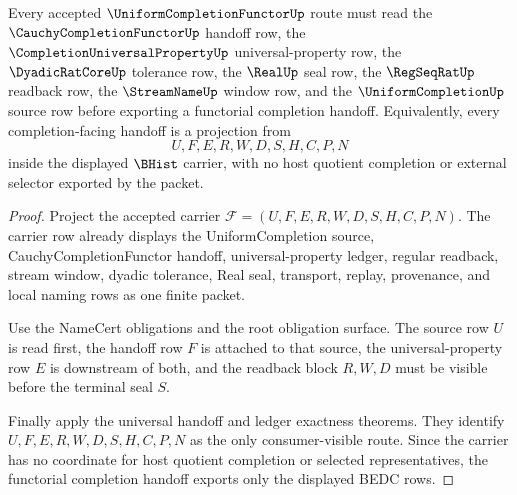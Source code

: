 \begin{theorem}
\label{thm:uniform-completion-functor-route-obligations}
Every accepted $\UniformCompletionFunctorUp$ route must read the $\CauchyCompletionFunctorUp$ handoff row, the $\CompletionUniversalPropertyUp$ universal-property row, the $\DyadicRatCoreUp$ tolerance row, the $\RealUp$ seal row, the $\RegSeqRatUp$ readback row, the $\StreamNameUp$ window row, and the $\UniformCompletionUp$ source row before exporting a functorial completion handoff. Equivalently, every completion-facing handoff is a projection from
$$
U,F,E,R,W,D,S,H,C,P,N
$$
inside the displayed $\BHist$ carrier, with no host quotient completion or external selector exported by the packet.
\end{theorem}
\begin{proof}
Project the accepted carrier $\mathcal{F}=(U,F,E,R,W,D,S,H,C,P,N)$. The carrier row already displays the UniformCompletion source, CauchyCompletionFunctor handoff, universal-property ledger, regular readback, stream window, dyadic tolerance, Real seal, transport, replay, provenance, and local naming rows as one finite packet.

Use the NameCert obligations and the root obligation surface. The source row $U$ is read first, the handoff row $F$ is attached to that source, the universal-property row $E$ is downstream of both, and the readback block $R,W,D$ must be visible before the terminal seal $S$.

Finally apply the universal handoff and ledger exactness theorems. They identify $U,F,E,R,W,D,S,H,C,P,N$ as the only consumer-visible route. Since the carrier has no coordinate for host quotient completion or selected representatives, the functorial completion handoff exports only the displayed BEDC rows.
\end{proof}

